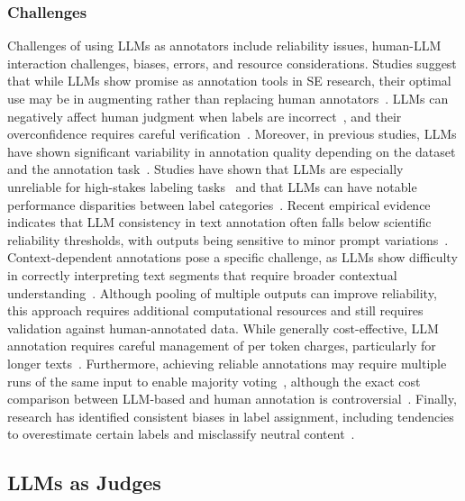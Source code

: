 \subsubsection{Challenges}
Challenges of using LLMs as annotators include reliability issues, human-LLM interaction challenges, biases, errors, and resource considerations.
Studies suggest that while LLMs show promise as annotation tools in SE research, their optimal use may be in augmenting rather than replacing human annotators~\cite{DBLP:conf/emnlp/WangLXZZ21, DBLP:conf/chi/HeHDRH24}.
LLMs can negatively affect human judgment when labels are incorrect~\cite{DBLP:conf/www/HuangKA23a}, and their overconfidence requires careful verification~\cite{DBLP:conf/kdd/WanSJKCNSSWYABJ24}.
Moreover, in previous studies, LLMs have shown significant variability in annotation quality depending on the dataset and the annotation task~\cite{DBLP:journals/corr/abs-2306-00176}.
Studies have shown that LLMs are especially unreliable for high-stakes labeling tasks~\cite{DBLP:conf/chi/Wang0RMM24} and that LLMs can have notable performance disparities between label categories~\cite{DBLP:journals/corr/abs-2304-10145}.
Recent empirical evidence indicates that LLM consistency in text annotation often falls below scientific reliability thresholds, with outputs being sensitive to minor prompt variations~\cite{DBLP:journals/corr/abs-2304-11085}.
Context-dependent annotations pose a specific challenge, as LLMs show difficulty in correctly interpreting text segments that require broader contextual understanding~\cite{DBLP:conf/chi/HeHDRH24}.
Although pooling of multiple outputs can improve reliability, this approach requires additional computational resources and still requires validation against human-annotated data.
While generally cost-effective, LLM annotation requires careful management of per token charges, particularly for longer texts~\cite{DBLP:conf/emnlp/WangLXZZ21}. Furthermore, achieving reliable annotations may require multiple runs of the same input to enable majority voting~\cite{DBLP:journals/corr/abs-2304-11085}, although the exact cost comparison between LLM-based and human annotation is controversial~\cite{DBLP:conf/chi/HeHDRH24}.
Finally, research has identified consistent biases in label assignment, including tendencies to overestimate certain labels and misclassify neutral content~\cite{DBLP:journals/corr/abs-2304-10145}.


\subsection{LLMs as Judges}
\label{sec:llms-as-judges}

